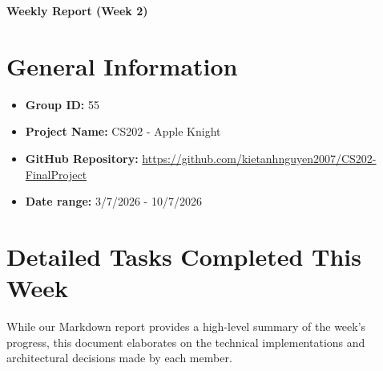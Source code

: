 \documentclass[12pt,a4paper]{article}
\begin{document}
\begin{center}
    \LARGE \textbf{Weekly Report (Week 2)} \\
    \vspace{0.5cm}
\end{center}

\section*{General Information}
\begin{itemize}
    \item \textbf{Group ID:} 55
    \item \textbf{Project Name:} CS202 - Apple Knight
    \item \textbf{GitHub Repository:} \url{https://github.com/kietanhnguyen2007/CS202-FinalProject}
    \item \textbf{Date range:} 3/7/2026 - 10/7/2026
\end{itemize}

\section*{Detailed Tasks Completed This Week}
While our Markdown report provides a high-level summary of the week's progress, this document elaborates on the technical implementations and architectural decisions made by each member.
\end{document}
